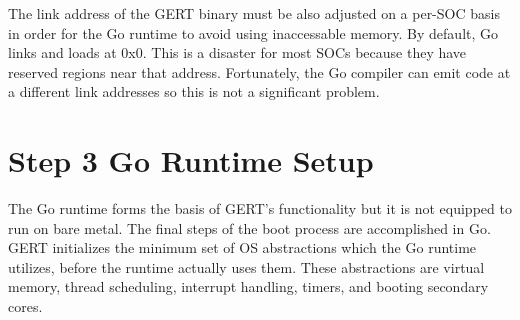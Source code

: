 The link address of the GERT binary must be also adjusted on a per-SOC basis in order for the Go
runtime to avoid using inaccessable memory. By default, Go links and loads at 0x0. This is a disaster
for most SOCs because they have reserved regions near that address. Fortunately, the Go compiler can
emit code at a different link addresses so this is not a significant problem.



\section{Step 3 Go Runtime Setup}

The Go runtime forms the basis of GERT's functionality but it is not equipped to
run on bare metal. The final steps of the boot process are accomplished in Go. GERT
initializes the minimum set of OS abstractions
which the Go runtime utilizes, before the runtime actually uses them. These abstractions are
virtual memory, thread scheduling, interrupt handling, timers, and booting secondary cores.



